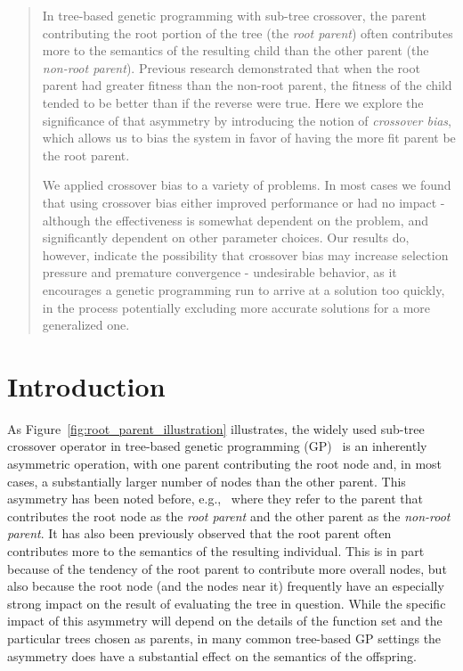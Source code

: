 \documentclass{sig-alternate}
\begin{document}
\begin{abstract}

In tree-based genetic programming with sub-tree crossover, the parent contributing the root portion of the tree (the
\emph{root parent}) often contributes more to the semantics of the resulting child than the other parent (the
\emph{non-root parent}). Previous research demonstrated that when the root parent had greater fitness than the non-root
parent, the fitness of the child tended to be better than if the reverse were true. Here we explore the significance of
that asymmetry by introducing the notion of \emph{crossover bias}, which allows us to bias the system in favor of
having the more fit parent be the root parent.

We applied crossover bias to a variety of problems. In most cases we found that using crossover bias either improved
performance or had no impact - although the effectiveness is somewhat dependent on the problem, and significantly dependent on other parameter choices. Our results do, however, indicate the possibility that crossover bias may increase selection pressure and premature convergence - undesirable behavior, as it encourages a genetic programming run to arrive at a solution too quickly, in the process potentially excluding more accurate solutions for a more generalized one.

\end{abstract}

\category{}{}{}
\terms{}

\section{Introduction} \label{sec:Introduction}

As Figure~\ref{fig:root_parent_illustration} illustrates, the widely used sub-tree crossover operator in tree-based 
genetic programming (GP)~\cite{poli08:fieldguide} is an inherently
asymmetric operation, with one parent contributing the root node and, in most cases, a substantially larger
number of nodes than the other parent. This asymmetry has been noted before, e.g.,~\cite{mcphee1999analysis}
where they refer to the parent that contributes the root node as the \emph{root parent} and the other parent as
the \emph{non-root parent}.
It has also been previously observed 
\cite{McPheeDonatucciDramdahl:2014, McPhee:2008:SBB:1792694.1792707} 
that the root parent often contributes more to the semantics of the resulting 
individual. This is in part because of the tendency of the root parent to contribute more 
overall nodes, but also because the root node (and the nodes near it) frequently have an especially 
strong impact on the result of evaluating the tree in question. While the specific impact of this asymmetry will 
depend on the details of the function set and the particular trees chosen as parents, in many common 
tree-based GP settings the asymmetry does have a substantial effect on the semantics of the offspring.
\end{document}
